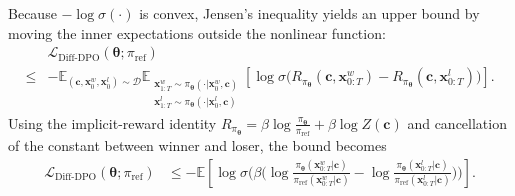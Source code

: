 Because $-\log\sigma(\cdot)$ is convex, Jensen’s inequality yields an upper bound by moving the inner expectations outside the nonlinear function:
\begin{align*}
&\mathcal L_{\mathrm{Diff\text{-}DPO}}(\bm\theta;\pi_{\mathrm{ref}})
\\ \le  &
-\mathbb E_{(\mathbf c,\mathbf x_0^w,\mathbf x_0^l)\sim\mathcal D}
  \mathbb E_{\substack{\mathbf x^w_{1:T}\sim \pi_{\bm\theta}(\cdot | \mathbf x_0^w,\mathbf c)\\[1pt]
                       \mathbf x^l_{1:T}\sim \pi_{\bm\theta}(\cdot | \mathbf x_0^l,\mathbf c)}}
\left[
\log \sigma \Big(
R_{\pi_{\bm\theta}}(\mathbf c,\mathbf x^w_{0:T})
-
R_{\pi_{\bm\theta}}(\mathbf c,\mathbf x^l_{0:T})
\Big)
\right].
\end{align*}
Using the implicit-reward identity $R_{\pi_{\bm\theta}}=\beta\log\frac{\pi_{\bm\theta}}{\pi_{\mathrm{ref}}}+\beta\log Z(\mathbf c)$ and cancellation of the constant between winner and loser, the bound becomes
\begin{align}\label{eq:dpo-path-bound}
\mathcal L_{\mathrm{Diff\text{-}DPO}}(\bm\theta;\pi_{\mathrm{ref}})
& \le
-\mathbb E
\left[
\log \sigma \Big(
\beta\big(
\log\frac{\pi_{\bm\theta}(\mathbf x^w_{0:T}| \mathbf c)}{\pi_{\mathrm{ref}}(\mathbf x^w_{0:T}| \mathbf c)}
-
\log\frac{\pi_{\bm\theta}(\mathbf x^l_{0:T}| \mathbf c)}{\pi_{\mathrm{ref}}(\mathbf x^l_{0:T}| \mathbf c)}
\big)
\Big)
\right].
\end{align}


